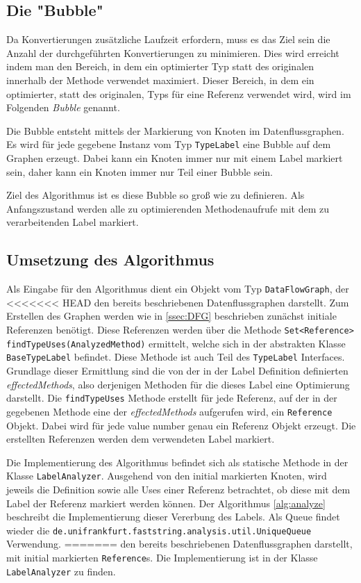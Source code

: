 \subsection{Die "Bubble"}

Da Konvertierungen zusätzliche Laufzeit erfordern, muss es das Ziel sein die Anzahl 
der durchgeführten Konvertierungen zu minimieren. Dies wird erreicht indem man den
Bereich, in dem ein optimierter Typ statt des originalen innerhalb der Methode 
verwendet maximiert. Dieser Bereich, in dem ein optimierter, statt des originalen, 
Typs für eine Referenz verwendet wird, wird im Folgenden \textit{Bubble} genannt. 

Die Bubble entsteht mittels der Markierung von Knoten im Datenflussgraphen. Es wird 
für jede gegebene Instanz vom Typ \texttt{TypeLabel} eine Bubble auf dem Graphen 
erzeugt. Dabei kann ein Knoten immer nur mit einem Label markiert sein, daher kann
ein Knoten immer nur Teil einer Bubble sein.

Ziel des Algorithmus ist es diese Bubble so groß wie zu definieren. Als Anfangszustand 
werden alle zu optimierenden Methodenaufrufe mit dem zu verarbeitenden Label markiert.

\subsection{Umsetzung des Algorithmus}\label{ssec:umAlg}

Als Eingabe für den Algorithmus dient ein Objekt vom Typ \texttt{DataFlowGraph}, der 
<<<<<<< HEAD
den bereits beschriebenen Datenflussgraphen darstellt. Zum Erstellen des Graphen werden
wie in \ref{ssec:DFG} beschrieben zunächst initiale Referenzen benötigt. Diese Referenzen
werden über die Methode \texttt{Set<Reference>} \\ \texttt{findTypeUses(AnalyzedMethod)} ermittelt, 
welche sich in der abstrakten Klasse \texttt{BaseTypeLabel} befindet. Diese Methode ist auch Teil des 
\texttt{TypeLabel} Interfaces. Grundlage dieser Ermittlung sind die von der in der Label 
Definition definierten \textit{effectedMethods}, also derjenigen Methoden für die dieses 
Label eine Optimierung darstellt. Die \texttt{findTypeUses} Methode erstellt für jede 
Referenz, auf der in der gegebenen Methode eine der \textit{effectedMethods} aufgerufen 
wird, ein \texttt{Reference} Objekt. Dabei wird für jede value number genau ein Referenz 
Objekt erzeugt. Die erstellten Referenzen werden dem verwendeten Label markiert.

Die Implementierung des Algorithmus befindet sich als statische Methode in der Klasse 
\texttt{LabelAnalyzer}. Ausgehend von den initial markierten Knoten, wird jeweils die 
Definition sowie alle Uses einer Referenz betrachtet, ob diese mit dem Label der Referenz 
markiert werden können. Der Algorithmus \ref{alg:analyze} beschreibt die Implementierung 
dieser Vererbung des Labels. Als Queue findet wieder die 
\texttt{de.unifrankfurt.faststring.analysis.util.UniqueQueue} Verwendung.
=======
den bereits beschriebenen Datenflussgraphen darstellt, mit initial markierten
\texttt{Reference}s. Die Implementierung ist in der Klasse \texttt{LabelAnalyzer}
zu finden. 

